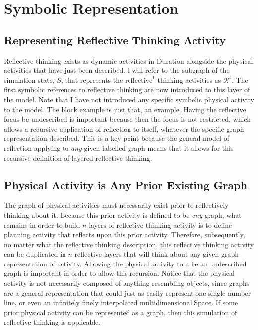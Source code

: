 \chapter{Symbolic Representation}
\label{chapter:symbolic_representation}

\section{Representing Reflective Thinking Activity}

Reflective thinking exists as dynamic activities in Duration alongside
the physical activities that have just been described.  I will refer
to the subgraph of the simulation state, $S$, that represents the
$\text{reflective}^1$ thinking activities as $\mathcal{R}^1$.  The
first symbolic references to reflective thinking are now introduced to
this layer of the model.  Note that I have not introduced any specific
symbolic physical activity to the model.  The block example is just
that, an example.  Having the reflective focus be undescribed is
important because then the focus is not restricted, which allows a
recursive application of reflection to itself, whatever the specific
graph representation described.  This is a key point because the
general model of reflection applying to \emph{any} given labelled
graph means that it allows for this recursive definition of layered
reflective thinking.

\section{Physical Activity is Any Prior Existing Graph}

The graph of physical activities must necessarily exist prior to
reflectively thinking about it.  Because this prior activity is
defined to be \emph{any} graph, what remains in order to build $n$
layers of reflective thinking activity is to define planning activity
that reflects upon this prior activity.  Therefore, subsequently, no
matter what the reflective thinking description, this reflective
thinking activity can be duplicated in $n$ reflective layers that will
think about any given graph representation of activity.  Allowing the
physical activity to a be an undescribed graph is important in order
to allow this recursion.  Notice that the physical activity is not
necessarily composed of anything resembling objects, since graphs are
a general representation that could just as easily represent one
single number line, or even an infinitely finely interpolated
multidimensional Space.  If some prior physical activity can be
represented as a graph, then this simulation of reflective thinking is
applicable.

